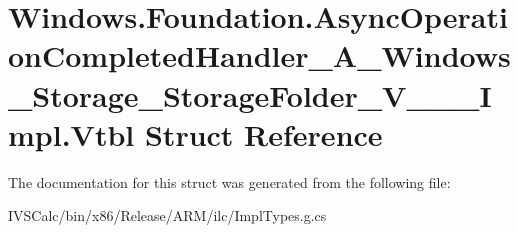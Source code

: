 \hypertarget{struct_windows_1_1_foundation_1_1_async_operation_completed_handler___a___windows___storage___stb1270e57dc57ebe6e25701769ba707c3}{}\section{Windows.\+Foundation.\+Async\+Operation\+Completed\+Handler\+\_\+\+A\+\_\+\+Windows\+\_\+\+Storage\+\_\+\+Storage\+Folder\+\_\+\+V\+\_\+\+\_\+\+\_\+\+Impl.\+Vtbl Struct Reference}
\label{struct_windows_1_1_foundation_1_1_async_operation_completed_handler___a___windows___storage___stb1270e57dc57ebe6e25701769ba707c3}


The documentation for this struct was generated from the following file\+:\begin{DoxyCompactItemize}
\item 
I\+V\+S\+Calc/bin/x86/\+Release/\+A\+R\+M/ilc/Impl\+Types.\+g.\+cs\end{DoxyCompactItemize}
